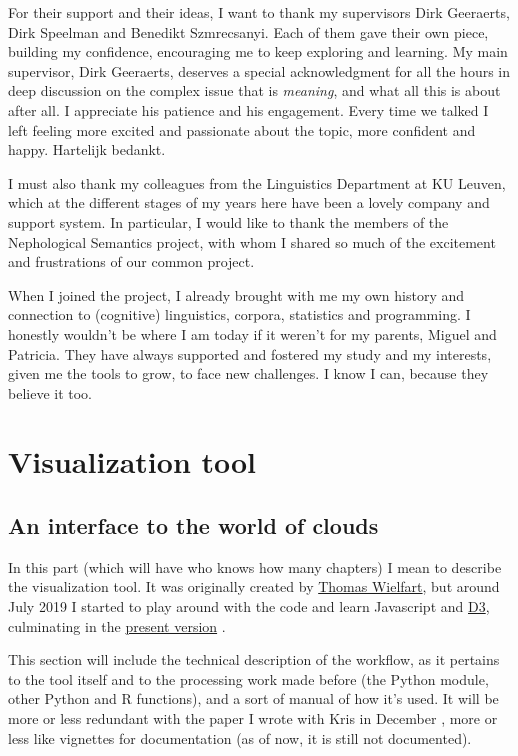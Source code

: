 \documentclass[
]{book}
\begin{document}
For their support and their ideas, I want to thank my supervisors Dirk Geeraerts,
Dirk Speelman and Benedikt Szmrecsanyi. Each of them gave their own piece, building
my confidence, encouraging me to keep exploring and learning. My main supervisor,
Dirk Geeraerts, deserves a special acknowledgment for all the hours in deep
discussion on the complex issue that is \emph{meaning}, and what all this is about after
all. I appreciate his patience and his engagement. Every time we talked I left
feeling more excited and passionate about the topic, more confident and happy.
Hartelijk bedankt.

I must also thank my colleagues from the Linguistics Department at KU Leuven,
which at the different stages of my years here have been a lovely company and
support system. In particular, I would like to thank the members of the
Nephological Semantics project, with whom I shared so much of the excitement and
frustrations of our common project.

When I joined the project, I already brought with me my own history and connection
to (cognitive) linguistics, corpora, statistics and programming. I honestly wouldn't
be where I am today if it weren't for my parents, Miguel and Patricia. They have
always supported and fostered my study and my interests, given me the tools to
grow, to face new challenges. I know I can, because they believe it too.

\hypertarget{part-visualization-tool}{%
\part{Visualization tool}\label{part-visualization-tool}}

\hypertarget{an-interface-to-the-world-of-clouds}{%
\chapter{An interface to the world of clouds}\label{an-interface-to-the-world-of-clouds}}

In this part (which will have who knows how many chapters) I mean to describe
the visualization tool. It was originally created by \href{https://github.com/tokenclouds/tokenclouds.github.io}{Thomas Wielfart},
but around July 2019 I started to play around with the code and learn Javascript
and \href{https://d3js.org}{D3}, culminating in the \href{https://github.com/qlvl/NephoVis}{present version} \autocite{montes.qlvl_2021}.

This section will include the technical description of the workflow, as it pertains
to the tool itself and to the processing work made before (the Python module, other
Python and R functions), and a sort of manual of how it's used. It will be more or less
redundant with the paper I wrote with Kris in December \autocite{montes.heylen_Submitted},
more or less like vignettes for documentation (as of now, it is still not documented).
\end{document}
